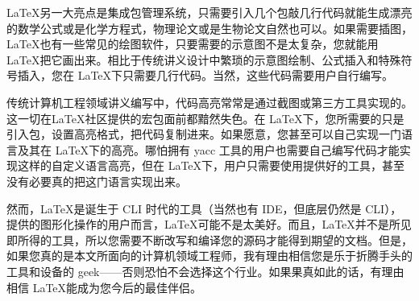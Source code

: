 \LaTeX 另一大亮点是集成包管理系统，只需要引入几个包敲几行代码就能生成漂亮的数学公式或是化学方程式，物理论文或是生物论文自然也可以。如果需要插图，\LaTeX 也有一些常见的绘图软件，只要需要的示意图不是太复杂，您就能用 \LaTeX 把它画出来。相比于传统讲义设计中繁琐的示意图绘制、公式插入和特殊符号插入，您在 \LaTeX 下只需要几行代码。当然，这些代码需要用户自行编写。

传统计算机工程领域讲义编写中，代码高亮常常是通过截图或第三方工具实现的。这一切在\LaTeX 社区提供的宏包面前都黯然失色。在 \LaTeX 下，您所需要的只是引入包，设置高亮格式，把代码复制进来。如果愿意，您甚至可以自己实现一门语言及其在 \LaTeX 下的高亮。哪怕拥有 yacc 工具的用户也需要自己编写代码才能实现这样的自定义语言高亮，但在 \LaTeX 下，用户只需要使用提供好的工具，甚至没有必要真的把这门语言实现出来。

​然而，\LaTeX 是诞生于 CLI 时代的工具（当然也有 IDE，但底层仍然是 CLI）， 提供的图形化操作的用户而言，\LaTeX 可能不是太美好。而且，\LaTeX 并不是所见即所得的工具，所以您需要不断改写和编译您的源码才能得到期望的文档。但是，如果您真的是本文所面向的计算机领域工程师，我有理由相信您是乐于折腾手头的工具和设备的 geek——否则恐怕不会选择这个行业。如果果真如此的话，有理由相信 \LaTeX 能成为您今后的最佳伴侣。